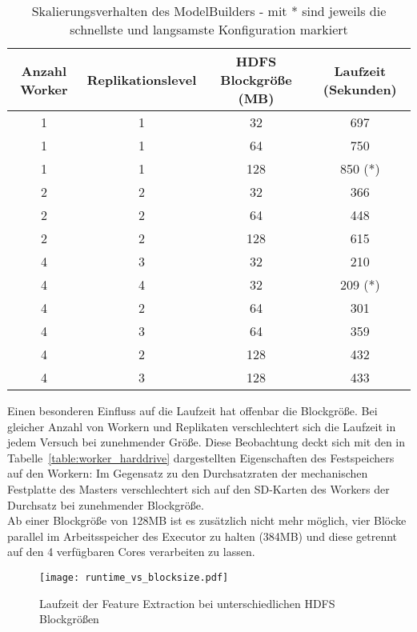 \begin{table}[ht]
	\centering %
	\begin{tabular}{c c c c} %
	\hline\hline %
	Anzahl Worker & Replikationslevel & HDFS Blockgröße (MB) & Laufzeit (Sekunden) \\ [0.5ex] %
	\hline %
	1 & 1 & 32 & 697 \\ %
	1 & 1 & 64 & 750 \\
	1 & 1 & 128 & 850 (*)\\
	2 & 2 & 32 & 366 \\
	2 & 2 & 64 & 448 \\
	2 & 2 & 128 & 615 \\
	4 & 3 & 32 & 210 \\
	4 & 4 & 32 & 209 (*)\\
	4 & 2 & 64 & 301 \\
	4 & 3 & 64 & 359 \\
	4 & 2 & 128 & 432 \\
	4 & 3 & 128 & 433 \\ [1ex] 
	\hline %
	\end{tabular}
	\caption{Skalierungsverhalten des ModelBuilders - mit * sind jeweils die schnellste und langsamste Konfiguration markiert} %
	\label{table:scaling} %
\end{table}

Einen besonderen Einfluss auf die Laufzeit hat offenbar die Blockgröße. Bei gleicher Anzahl von Workern und Replikaten verschlechtert sich die Laufzeit in jedem Versuch bei zunehmender Größe. Diese Beobachtung deckt sich mit den in Tabelle~\ref{table:worker_harddrive} dargestellten Eigenschaften des Festspeichers auf den Workern: 
Im Gegensatz zu den Durchsatzraten der mechanischen Festplatte des Masters verschlechtert sich auf den SD-Karten des Workers der Durchsatz bei zunehmender Blockgröße.\\
Ab einer Blockgröße von 128MB ist es zusätzlich nicht mehr möglich, vier Blöcke parallel im Arbeitsspeicher des Executor zu halten (384MB) und diese getrennt auf den 4 verfügbaren Cores verarbeiten zu lassen.

\begin{figure}[ht!]
	\centering
  \texttt{[image: runtime\_vs\_blocksize.pdf]}
	\caption{Laufzeit der Feature Extraction bei unterschiedlichen HDFS Blockgrößen}
	\label{figure:runtime_vs_blocksize}
\end{figure}


